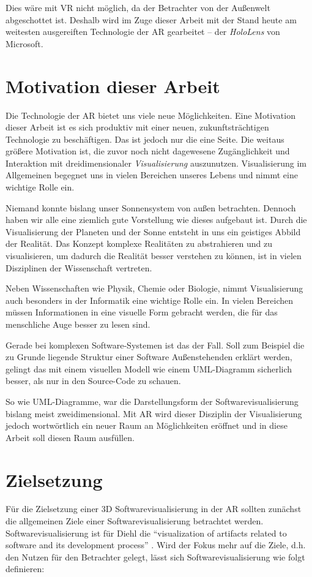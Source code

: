 Dies wäre mit VR nicht möglich, da der Betrachter von der Außenwelt abgeschottet ist. Deshalb wird im Zuge dieser Arbeit mit der Stand heute am weitesten ausgereiften Technologie der AR gearbeitet -- der \emph{HoloLens} von Microsoft.

\section{Motivation dieser Arbeit}
Die Technologie der AR bietet uns viele neue Möglichkeiten. Eine Motivation dieser Arbeit ist es sich produktiv mit einer neuen, zukunftsträchtigen Technologie zu beschäftigen. Das ist jedoch nur die eine Seite. Die weitaus größere Motivation ist, die zuvor noch nicht dagewesene Zugänglichkeit und Interaktion mit dreidimensionaler \emph{Visualisierung} auszunutzen. Visualisierung im Allgemeinen begegnet uns in vielen Bereichen unseres Lebens und nimmt eine wichtige Rolle ein.

Niemand konnte bislang unser Sonnensystem von außen betrachten. Dennoch haben wir alle eine ziemlich gute Vorstellung wie dieses aufgebaut ist. Durch die Visualisierung der Planeten und der Sonne entsteht in uns ein geistiges Abbild der Realität. Das Konzept komplexe Realitäten zu abstrahieren und zu visualisieren, um dadurch die Realität besser verstehen zu können, ist in vielen Disziplinen der Wissenschaft vertreten.

Neben Wissenschaften wie Physik, Chemie oder Biologie, nimmt Visualisierung
auch besonders in der Informatik eine wichtige Rolle ein. In vielen Bereichen müssen Informationen in eine visuelle Form gebracht werden, die für das menschliche Auge besser zu lesen sind.

Gerade bei komplexen Software-Systemen ist das der Fall. Soll zum Beispiel die zu Grunde liegende Struktur einer Software Außenstehenden erklärt werden, gelingt das mit einem visuellen Modell wie einem UML-Diagramm sicherlich besser, als nur in den Source-Code zu schauen.

So wie UML-Diagramme, war die Darstellungsform der Softwarevisualisierung bislang meist zweidimensional. Mit AR wird dieser Disziplin der Visualisierung jedoch wortwörtlich ein neuer Raum an Möglichkeiten eröffnet und in diese Arbeit soll diesen Raum ausfüllen.

\section{Zielsetzung}
Für die Zielsetzung einer 3D Softwarevisualisierung in der AR sollten zunächst die allgemeinen Ziele einer Softwarevisualisierung betrachtet werden. Softwarevisualisierung ist für Diehl die "`visualization of artifacts related to software and its development process"' \cite{diehl2007software}. Wird der Fokus mehr auf die Ziele, d.h. den Nutzen für den Betrachter gelegt, lässt sich Softwarevisualisierung wie folgt definieren:

